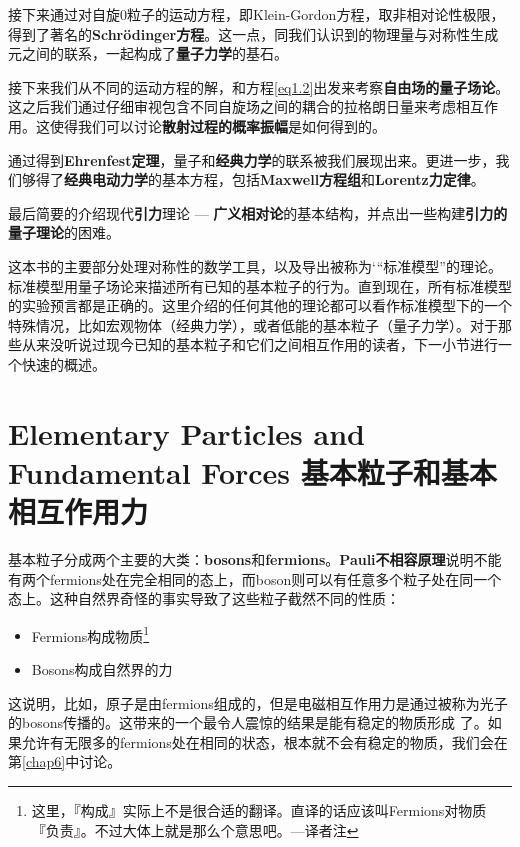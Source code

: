 接下来通过对自旋$0$粒子的运动方程，即Klein-Gordon方程，取非相对论性极限，得到了著名的{\bf Schrödinger方程}。这一点，同我们认识到的物理量与对称性生成元之间的联系，一起构成了{\bf 量子力学}的基石。

接下来我们从不同的运动方程的解，和方程\eqref{eq1.2}出发来考察{\bf 自由场的量子场论}。这之后我们通过仔细审视包含不同自旋场之间的耦合的拉格朗日量来考虑相互作用。这使得我们可以讨论{\bf 散射过程的概率振幅}是如何得到的。

通过得到{\bf Ehrenfest定理}，量子和{\bf 经典力学}的联系被我们展现出来。更进一步，我们够得了{\bf 经典电动力学}的基本方程，包括{\bf Maxwell方程组}和{\bf Lorentz力定律}。

最后简要的介绍现代{\bf 引力}理论 --- {\bf 广义相对论}的基本结构，并点出一些构建{\bf 引力的量子理论}的困难。

这本书的主要部分处理对称性的数学工具，以及导出被称为‘“标准模型”的理论。标准模型用量子场论来描述所有已知的基本粒子的行为。直到现在，所有标准模型的实验预言都是正确的。这里介绍的任何其他的理论都可以看作标准模型下的一个特殊情况，比如宏观物体（经典力学），或者低能的基本粒子（量子力学）。对于那些从来没听说过现今已知的基本粒子和它们之间相互作用的读者，下一小节进行一个快速的概述。

\section[基本粒子和基本相互作用力]{Elementary Particles and Fundamental Forces 基本粒子和基本相互作用力}\label{sec1.3}

基本粒子分成两个主要的大类：{\bf bosons}和{\bf fermions}。{\bf Pauli不相容原理}说明不能有两个fermions处在完全相同的态上，而boson则可以有任意多个粒子处在同一个态上。这种自然界奇怪的事实导致了这些粒子截然不同的性质：

\begin{itemize}
\item Fermions构成物质\footnote{这里，『构成』实际上不是很合适的翻译。直译的话应该叫Fermions对物质『负责』。不过大体上就是那么个意思吧。---译者注}
\item Bosons构成自然界的力
\end{itemize}

这说明，比如，原子是由fermions组成的，但是电磁相互作用力是通过被称为光子的bosons传播的。这带来的一个最令人震惊的结果是能有稳定的物质形成 了。如果允许有无限多的fermions处在相同的状态，根本就不会有稳定的物质，我们会在第\ref{chap6}中讨论。

